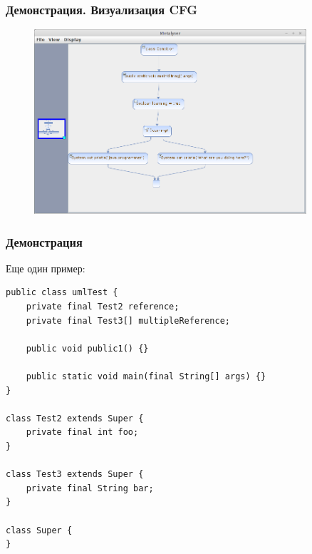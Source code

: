 \documentclass{beamer}
\begin{document}
\begin{frame}
\frametitle{Демонстрация. Визуализация CFG}

\begin{figure}[h]
    \begin{center}
        \includegraphics[width=0.9\textwidth]{../fig/cfg_test1.png}
    \end{center}
\end{figure}

\end{frame}
\begin{frame}[fragile]
\frametitle{Демонстрация}

Еще один пример:

\begin{lstlisting}
public class umlTest {
    private final Test2 reference;
    private final Test3[] multipleReference;

    public void public1() {}

    public static void main(final String[] args) {}
}

class Test2 extends Super {
    private final int foo;
}

class Test3 extends Super {
    private final String bar;
}

class Super {
}
\end{lstlisting}

\end{frame}
\end{document}
